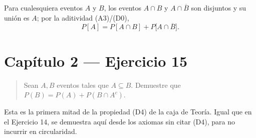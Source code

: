 \documentclass[11pt]{article}
\begin{document}
\begin{resp}
Para cualesquiera eventos $A$ y $B$, los eventos $A\cap B$ y $A\cap\overline{B}$ son disjuntos y
su unión es $A$; por la aditividad (A3)/(D0),
\[
\boxed{\;P[A]=P[A\cap B]+P\big[A\cap\overline{B}\big].\;}
\]
\end{resp}

\section*{Capítulo 2 --- Ejercicio 15}

\begin{quote}
Sean $A,B$ eventos tales que $A\subseteq B$. Demuestre que $P(B)=P(A)+P(B\cap A^{c})$.
\end{quote}

\begin{nota}
Esta es la primera mitad de la propiedad (D4) de la caja de Teoría. Igual que en el Ejercicio
14, se demuestra aquí desde los axiomas sin citar (D4), para no incurrir en circularidad.
\end{nota}
\end{document}
